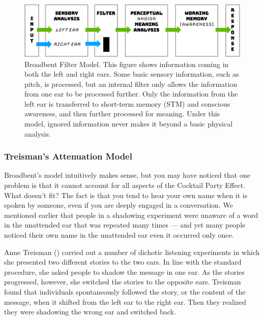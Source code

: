 \documentclass[
]{krantz}
\begin{document}
\begin{figure}

{\centering \includegraphics[width=0.8\linewidth]{images/3_attention/broadbent} 

}

\caption{Broadbent Filter Model. This figure shows information coming in both the left and right ears. Some basic sensory information, such as pitch, is processed, but an internal filter only allows the information from one ear to be processed further. Only the information from the left ear is transferred to short-term memory (STM) and conscious awareness, and then further processed for meaning. Under this model, ignored information never makes it beyond a basic physical analysis.}\label{fig:broadbent}
\end{figure}

\subsubsection*{Treisman's Attenuation Model}\label{treismans-attenuation-model}


Broadbent's model intuitively makes sense, but you may have noticed that one problem is that it cannot account for all aspects of the Cocktail Party Effect. What doesn't fit? The fact is that you tend to hear your own name when it is spoken by someone, even if you are deeply engaged in a conversation. We mentioned earlier that people in a shadowing experiment were unaware of a word in the unattended ear that was repeated many times --- and yet many people noticed their own name in the unattended ear even it occurred only once.

Anne Treisman () carried out a number of dichotic listening experiments in which she presented two different stories to the two ears. In line with the standard procedure, she asked people to shadow the message in one ear. As the stories progressed, however, she switched the stories to the opposite ears. Treisman found that individuals spontaneously followed the story, or the content of the message, when it shifted from the left ear to the right ear. Then they realized they were shadowing the wrong ear and switched back.
\end{document}
